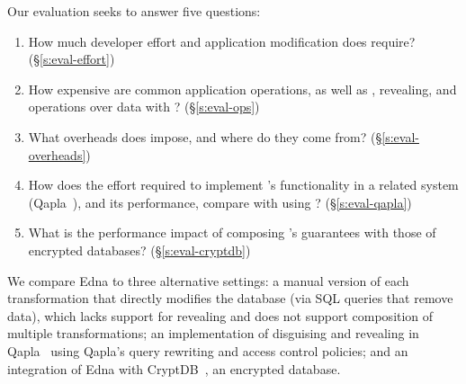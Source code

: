 
Our evaluation seeks to answer five questions:
%
\begin{enumerate}[nosep]
 \item How much developer effort and application modification does \sys require? (\S\ref{s:eval-effort})
%
\item How expensive are common application operations, as well as
  \xxing, revealing, and operations over \xxed data with \sys? (\S\ref{s:eval-ops})

\item What overheads does \sys impose, and where do they come from?
    (\S\ref{s:eval-overheads})

\item 
    How does the effort required to implement \sys's
    functionality in a related system (Qapla~\cite{qapla}),
    and its performance, compare with using \sys?
    (\S\ref{s:eval-qapla})

\item 
    What is the performance impact of composing \sys's guarantees
    with those of encrypted databases?
        (\S\ref{s:eval-cryptdb})
%
\end{enumerate}

We compare Edna to three alternative settings:
\one{} a manual version
of each \xxing transformation that directly modifies the database
(\eg via SQL queries that remove data), which
lacks support for revealing and does not support
composition of multiple transformations;
\two{} an implementation of disguising and revealing in Qapla~\cite{qapla}
using Qapla’s query rewriting and access control policies; and \three{} an integration of Edna with CryptDB~\cite{cryptdb}, an encrypted database.

%

%
%
%
%

